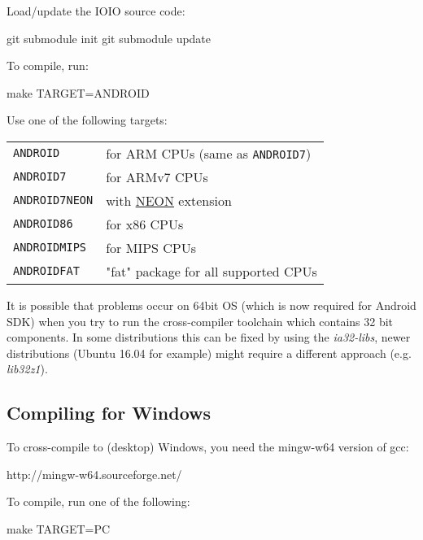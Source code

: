 Load/update the IOIO source code:

\begin{verbatim*}
git submodule init
git submodule update
\end{verbatim*}

To compile, run:

\begin{verbatim*}
make TARGET=ANDROID
\end{verbatim*}

Use one of the following targets:

\begin{tabularx}{1.9\textwidth}{lX}

\texttt{ANDROID} & for ARM CPUs (same as \texttt{ANDROID7}) \\

\texttt{ANDROID7} & for ARMv7 CPUs \\

\texttt{ANDROID7NEON} & with
\href{http://www.arm.com/products/processors/technologies/neon.php}{NEON}
extension \\

\texttt{ANDROID86} & for x86 CPUs \\

\texttt{ANDROIDMIPS} & for MIPS CPUs \\

\texttt{ANDROIDFAT} & "fat" package for all supported CPUs \\

\end{tabularx}

It is possible that problems occur on 64bit OS (which is now required for Android SDK) when you try to run the cross-compiler toolchain which contains 32 bit components. In some distributions this can be fixed by using the \emph{ia32-libs}, newer distributions (Ubuntu 16.04 for example) might require a different approach (e.g. \emph{lib32z1}).

\subsection{Compiling for Windows}

To cross-compile to (desktop) Windows, you need the mingw-w64 version
of gcc:

 http://mingw-w64.sourceforge.net/

To compile, run one of the following:

\begin{verbatim*}
make TARGET=PC
\end{verbatim*}

